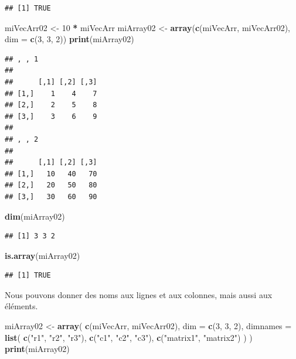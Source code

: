 \documentclass[]{book}
\newenvironment{Shaded}{\begin{snugshade}}{\end{snugshade}}
\newcommand{\DataTypeTok}[1]{\textcolor[rgb]{0.13,0.29,0.53}{#1}}
\newcommand{\DecValTok}[1]{\textcolor[rgb]{0.00,0.00,0.81}{#1}}
\newcommand{\KeywordTok}[1]{\textcolor[rgb]{0.13,0.29,0.53}{\textbf{#1}}}
\newcommand{\NormalTok}[1]{#1}
\newcommand{\OperatorTok}[1]{\textcolor[rgb]{0.81,0.36,0.00}{\textbf{#1}}}
\newcommand{\StringTok}[1]{\textcolor[rgb]{0.31,0.60,0.02}{#1}}
\begin{document}
\begin{verbatim}
## [1] TRUE
\end{verbatim}

\begin{Shaded}
\begin{Highlighting}[]
\NormalTok{miVecArr02 <-}\StringTok{ }\DecValTok{10} \OperatorTok{*}\StringTok{ }\NormalTok{miVecArr}
\NormalTok{miArray02 <-}\StringTok{ }\KeywordTok{array}\NormalTok{(}\KeywordTok{c}\NormalTok{(miVecArr, miVecArr02), }\DataTypeTok{dim =} \KeywordTok{c}\NormalTok{(}\DecValTok{3}\NormalTok{, }\DecValTok{3}\NormalTok{, }\DecValTok{2}\NormalTok{))}
\KeywordTok{print}\NormalTok{(miArray02)}
\end{Highlighting}
\end{Shaded}

\begin{verbatim}
## , , 1
## 
##      [,1] [,2] [,3]
## [1,]    1    4    7
## [2,]    2    5    8
## [3,]    3    6    9
## 
## , , 2
## 
##      [,1] [,2] [,3]
## [1,]   10   40   70
## [2,]   20   50   80
## [3,]   30   60   90
\end{verbatim}

\begin{Shaded}
\begin{Highlighting}[]
\KeywordTok{dim}\NormalTok{(miArray02)}
\end{Highlighting}
\end{Shaded}

\begin{verbatim}
## [1] 3 3 2
\end{verbatim}

\begin{Shaded}
\begin{Highlighting}[]
\KeywordTok{is.array}\NormalTok{(miArray02)}
\end{Highlighting}
\end{Shaded}

\begin{verbatim}
## [1] TRUE
\end{verbatim}

Nous pouvons donner des noms aux lignes et aux colonnes, mais aussi aux éléments.

\begin{Shaded}
\begin{Highlighting}[]
\NormalTok{miArray02 <-}\StringTok{ }\KeywordTok{array}\NormalTok{(}
  \KeywordTok{c}\NormalTok{(miVecArr, miVecArr02), }
  \DataTypeTok{dim =} \KeywordTok{c}\NormalTok{(}\DecValTok{3}\NormalTok{, }\DecValTok{3}\NormalTok{, }\DecValTok{2}\NormalTok{), }
  \DataTypeTok{dimnames =} \KeywordTok{list}\NormalTok{(}
    \KeywordTok{c}\NormalTok{(}\StringTok{"r1"}\NormalTok{, }\StringTok{"r2"}\NormalTok{, }\StringTok{"r3"}\NormalTok{), }
    \KeywordTok{c}\NormalTok{(}\StringTok{"c1"}\NormalTok{, }\StringTok{"c2"}\NormalTok{, }\StringTok{"c3"}\NormalTok{), }
    \KeywordTok{c}\NormalTok{(}\StringTok{"matrix1"}\NormalTok{, }\StringTok{"matrix2"}\NormalTok{)}
\NormalTok{  )}
\NormalTok{)}
\KeywordTok{print}\NormalTok{(miArray02)}
\end{Highlighting}
\end{Shaded}
\end{document}
